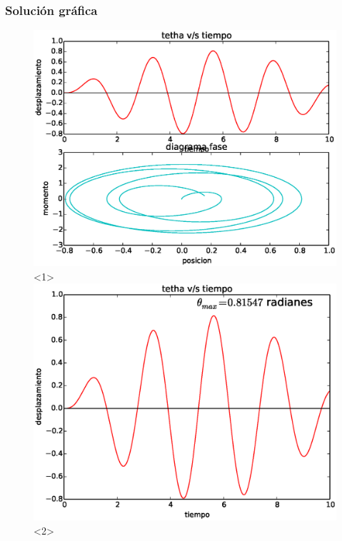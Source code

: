 \begin{frame}[fragile]
\frametitle{Solución gráfica}
\begin{figure}
	\centering
	\includegraphics[scale=0.5]{Examen3_P5_01.eps}<1>  
	\includegraphics[scale=0.5]{Examen3_P5_02.eps}<2>
\end{figure}
\end{frame}
